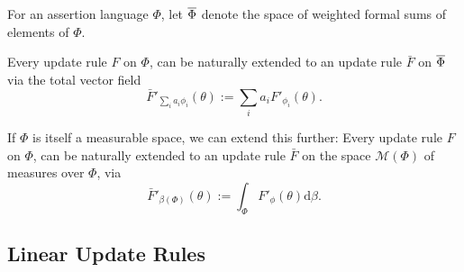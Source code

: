 \begin{defn}
For an assertion language $\Phi$, let $\overline \Phi$ denote
the space of weighted formal sums of elements of $\Phi$.
\end{defn}

\begin{prop}
Every  update rule $F$ on $\Phi$, can be naturally extended to an update rule
$\bar F$ on $\overline \Phi$
via the total vector field
\[
    \bar F'_{\textstyle\sum_i a_i \phi_i} ( \theta ) := \sum_{i} a_i F'_{\phi_i}(\theta).
\]
%
\end{prop}

If $\Phi$ is itself a measurable space, we can extend this further:
Every  update rule $F$ on $\Phi$, can be naturally extended to an update rule $\bar F$ on the space $\mathcal M(\Phi)$ of measures over $\Phi$, via
\[
\bar F'_{\beta(\Phi)}( \theta ) := \int_{\Phi} F'_\phi(\theta) \mathrm d\beta.
\]



%
%

%
%
\subsection{Linear Update Rules}

